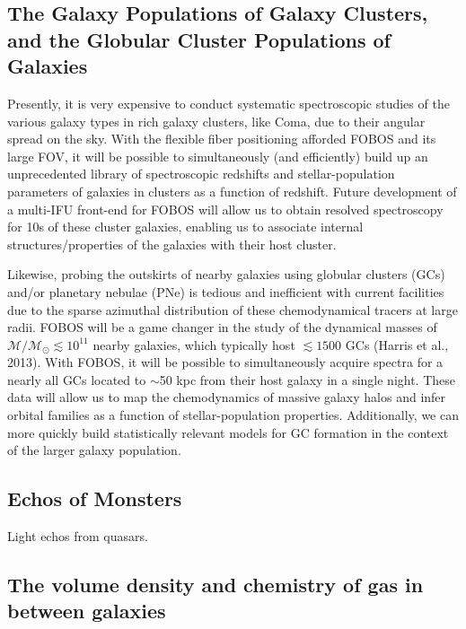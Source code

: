 
\subsection{The Galaxy Populations of Galaxy Clusters, and the
Globular Cluster Populations of Galaxies}

Presently, it is very expensive to conduct systematic spectroscopic
studies of the various galaxy types in rich galaxy clusters, like
Coma, due to their angular spread on the sky. With the flexible fiber
positioning afforded FOBOS and its large FOV, it will be possible to
simultaneously (and efficiently) build up an unprecedented library of
spectroscopic redshifts and stellar-population parameters of galaxies
in clusters as a function of redshift. Future development of a
multi-IFU front-end for FOBOS will allow us to obtain resolved
spectroscopy for 10s of these cluster galaxies, enabling us to
associate internal structures/properties of the galaxies with their
host cluster.

Likewise, probing the outskirts of nearby galaxies using globular
clusters (GCs) and/or planetary nebulae (PNe) is tedious and
inefficient with current facilities due to the sparse azimuthal
distribution of these chemodynamical tracers at large radii. FOBOS
will be a game changer in the study of the dynamical masses of
$\mathcal{M/M_\odot} \lesssim 10^{11}$ nearby galaxies, which
typically host $\lesssim1500$ GCs (Harris et al., 2013). With FOBOS,
it will be possible to simultaneously acquire spectra for a nearly
all GCs located to $\sim$50 kpc from their host galaxy in a single
night. These data will allow us to map the chemodynamics of massive
galaxy halos and infer orbital families as a function of
stellar-population properties. Additionally, we can more quickly
build statistically relevant models for GC formation in the context
of the larger galaxy population.

\subsection{Echos of Monsters}

Light echos from quasars.

\subsection{The volume density and chemistry of gas in between galaxies}


